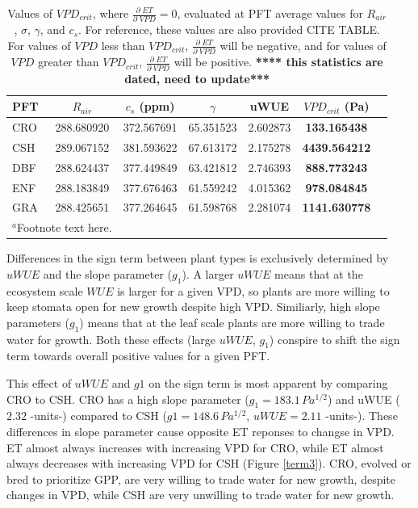 \documentclass[draft,linenumbers]{agujournal}
\begin{document}
\begin{table}
  \label{vpd_crit}
\caption{Values of $VPD_{crit}$, where $\frac{\partial \; ET}{\partial \; VPD} = 0$, evaluated at PFT average values for $R_{air}$, $\sigma$, $\gamma$, and $c_s$. For reference, these values are also provided CITE TABLE. For values of $VPD$ less than $VPD_{crit}$, $\frac{\partial \; ET}{\partial \; VPD}$ will be negative, and for values of $VPD$ greater than $VPD_{crit}$, $\frac{\partial \; ET}{\partial \; VPD}$ will be positive. \textbf{**** this statistics are dated, need to update***}}
\centering
\begin{tabular}{l c c c c c c}
  \hline
  PFT & $R_{air}$ & $c_s$ (ppm) & $\gamma$ &  uWUE    & \textbf{$VPD_{crit}$ (Pa)} \\
  \hline
  CRO &  288.680920 & 372.567691& 65.351523& 2.602873&  \textbf{133.165438} \\
  CSH &   289.067152& 381.593622& 67.613172& 2.175278& \textbf{4439.564212} \\
  DBF &   288.624437& 377.449849& 63.421812& 2.746393&  \textbf{888.773243} \\
  ENF &  288.183849& 377.676463& 61.559242& 4.015362&  \textbf{978.084845} \\
  GRA &  288.425651& 377.264645& 61.598768& 2.281074& \textbf{1141.630778} \\
\hline
\multicolumn{2}{l}{$^{a}$Footnote text here.}
\end{tabular}
\end{table}

Differences in the sign term between plant types is exclusively determined by $uWUE$ and the slope parameter ($g_1$). A larger $uWUE$ means that at the ecosystem scale $WUE$ is larger for a given VPD, so plants are more willing to keep stomata open for new growth despite high VPD. Similiarly, high slope parameters ($g_1$) means that at the leaf scale plants are more willing to trade water for growth. Both these effects (large $uWUE$, $g_1$) conspire to shift the sign term towards overall positive values for a given PFT.

This effect of $uWUE$ and $g1$ on the sign term is most apparent by comparing CRO to CSH. CRO has a high slope parameter ($g_1 = 183.1 \, Pa^{1/2}$) and uWUE ($2.32$ -units-) compared to CSH ($g1 = 148.6 \, Pa^{1/2}$, $uWUE=2.11$ -units-). These differences in slope parameter cause opposite ET reponses to changse in VPD. ET almost always increases with increasing VPD for CRO, while ET almost always decreases with increasing VPD for CSH (Figure \ref{term3}). CRO, evolved or bred to prioritize GPP, are very willing to trade water for new growth, despite changes in VPD, while CSH are very unwilling to trade water for new growth.
\end{document}
